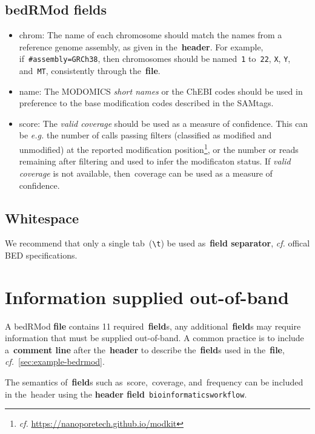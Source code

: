 \documentclass[11pt]{article}
\begin{document}
\subsection{\acs{bedRMod} fields}\label{sec:fields}
\begin{itemize}
\item \textsf{chrom}: The name of each chromosome should match the names from a reference genome assembly, as given in the~\textbf{header}.
  For example, if~\texttt{\#assembly=GRCh38}, then chromosomes should be named~\texttt{1} to~\texttt{22}, \texttt{X}, \texttt{Y}, and~\texttt{MT},
  consistently through the~\textbf{file}.
\item \textsf{name}: The MODOMICS \emph{short names} or the ChEBI codes should be used in preference to the base modification codes described in the SAMtags.
\item \textsf{score}: The \emph{valid coverage} should be used as a measure of confidence. This can be \textit{e.g.} the number of calls passing filters (classified as modified and unmodified) at the reported modification position\footnote{\textit{cf.} \url{https://nanoporetech.github.io/modkit}}, or the number or reads remaining after filtering and used to infer the modificaton status. If \emph{valid coverage} is not available, then~\textsf{coverage} can be used as a measure of confidence.
\end{itemize}

\subsection{Whitespace}\label{sec:whitespace}
We recommend that only a single tab~(\texttt{{\textbackslash}t}) be used as~\textbf{field separator}, \textit{cf.} offical \ac{BED} specifications.

\section{Information supplied out-of-band}

A \ac{bedRMod} \textbf{file} contains 11 required~\textbf{field}s, any additional~\textbf{field}s may require information that must be supplied out-of-band.
A common practice is to include a~\textbf{comment line} after the~\textbf{header} to describe the~\textbf{field}s used in the~\textbf{file}, \textit{cf.}~\autoref{sec:example-bedrmod}.

The semantics of~\textbf{field}s such as~\textsf{score},~\textsf{coverage}, and~\textsf{frequency} can be included in the~\textsf{header} using the \textbf{header field}~\texttt{bioinformatics\textunderscore workflow}.
\end{document}
